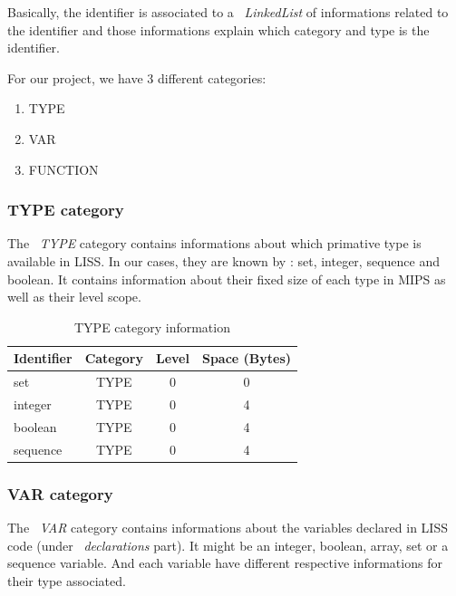 \documentclass[
  oneside,
  11pt, a4paper,
  footinclude=true,
  headinclude=true,
  cleardoublepage=empty
]{scrbook}
\begin{document}
Basically, the identifier is associated to a ~\textit{LinkedList} of informations related to the identifier and those informations explain which category and type is the identifier.

For our project, we have 3 different categories:
\begin{enumerate}
\item TYPE
\item VAR
\item FUNCTION
\end{enumerate}

\subsubsection{TYPE category}

The ~\textit{TYPE} category contains informations about which primative type is available in LISS. In our cases, they are known by : set, integer, sequence and boolean. 
It contains information about their fixed size of each type in MIPS as well as their level scope.

\begin{table}[h!]
\centering
\caption{TYPE category information}
\label{tbl:type_category_information}
\begin{tabular}{l|c|c|c}
\multicolumn{1}{c|}{Identifier} & \multicolumn{1}{l|}{Category} & \multicolumn{1}{l|}{Level} & \multicolumn{1}{l}{Space (Bytes)} \\ \hline
set                             & TYPE                          & 0                          & 0                                 \\ \hline
integer                         & TYPE                          & 0                          & 4                                 \\ \hline
boolean                         & TYPE                          & 0                          & 4                                 \\ \hline
sequence                        & TYPE                          & 0                          & 4                                
\end{tabular}
\end{table}

\subsubsection{VAR category}

The ~\textit{VAR} category contains informations about the variables declared in LISS code (under ~\textit{declarations} part). It might be an integer, boolean, array, set or a sequence variable.
And each variable have different respective informations for their type associated.
\end{document}
